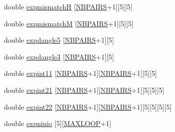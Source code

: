 \begin{DoxyCompactItemize}
\item 
double \mbox{\hyperlink{group__energy__parameters_a3638d270ea7979d80a75a7199a19717e}{expmismatchH}} \mbox{[}\mbox{\hyperlink{energy__const_8h_a5e75221c779d618eab81e096f37e32ce}{N\+B\+P\+A\+I\+RS}}+1\mbox{]}\mbox{[}5\mbox{]}\mbox{[}5\mbox{]}
\item 
double \mbox{\hyperlink{group__energy__parameters_ac6ed6415250369dd10fe392c7460a5c9}{expmismatchM}} \mbox{[}\mbox{\hyperlink{energy__const_8h_a5e75221c779d618eab81e096f37e32ce}{N\+B\+P\+A\+I\+RS}}+1\mbox{]}\mbox{[}5\mbox{]}\mbox{[}5\mbox{]}
\item 
double \mbox{\hyperlink{group__energy__parameters_ad013274ab70d044e382000eec41fea09}{expdangle5}} \mbox{[}\mbox{\hyperlink{energy__const_8h_a5e75221c779d618eab81e096f37e32ce}{N\+B\+P\+A\+I\+RS}}+1\mbox{]}\mbox{[}5\mbox{]}
\item 
double \mbox{\hyperlink{group__energy__parameters_a4dd91ccea8929e4779be114b9b76b28f}{expdangle3}} \mbox{[}\mbox{\hyperlink{energy__const_8h_a5e75221c779d618eab81e096f37e32ce}{N\+B\+P\+A\+I\+RS}}+1\mbox{]}\mbox{[}5\mbox{]}
\item 
double \mbox{\hyperlink{group__energy__parameters_ae58abb197b8bfb624513cb28858a8dab}{expint11}} \mbox{[}\mbox{\hyperlink{energy__const_8h_a5e75221c779d618eab81e096f37e32ce}{N\+B\+P\+A\+I\+RS}}+1\mbox{]}\mbox{[}\mbox{\hyperlink{energy__const_8h_a5e75221c779d618eab81e096f37e32ce}{N\+B\+P\+A\+I\+RS}}+1\mbox{]}\mbox{[}5\mbox{]}\mbox{[}5\mbox{]}
\item 
double \mbox{\hyperlink{group__energy__parameters_acb992a6f846f0d1720b111606d819164}{expint21}} \mbox{[}\mbox{\hyperlink{energy__const_8h_a5e75221c779d618eab81e096f37e32ce}{N\+B\+P\+A\+I\+RS}}+1\mbox{]}\mbox{[}\mbox{\hyperlink{energy__const_8h_a5e75221c779d618eab81e096f37e32ce}{N\+B\+P\+A\+I\+RS}}+1\mbox{]}\mbox{[}5\mbox{]}\mbox{[}5\mbox{]}\mbox{[}5\mbox{]}
\item 
double \mbox{\hyperlink{group__energy__parameters_aa8e5d06b019fb91bf7f1b866e5349fb6}{expint22}} \mbox{[}\mbox{\hyperlink{energy__const_8h_a5e75221c779d618eab81e096f37e32ce}{N\+B\+P\+A\+I\+RS}}+1\mbox{]}\mbox{[}\mbox{\hyperlink{energy__const_8h_a5e75221c779d618eab81e096f37e32ce}{N\+B\+P\+A\+I\+RS}}+1\mbox{]}\mbox{[}5\mbox{]}\mbox{[}5\mbox{]}\mbox{[}5\mbox{]}\mbox{[}5\mbox{]}
\item 
double \mbox{\hyperlink{group__energy__parameters_aa02a086c6fce358c984a9685d0c4ece7}{expninio}} \mbox{[}5\mbox{]}\mbox{[}\mbox{\hyperlink{energy__const_8h_ad1bd6eabac419670ddd3c9ed82145988}{M\+A\+X\+L\+O\+OP}}+1\mbox{]}

\end{DoxyCompactItemize}
